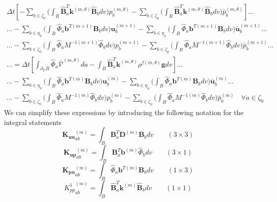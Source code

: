 \documentclass[11pt]{article} %
\begin{document}
\begin{eqnarray}
	\Delta t \left[ - \sum_{b \in \zeta_0} \bigg( \int_B \hat{\mathbf{B}}_a^T \mathbf{k}^{(m,\theta)} \hat{\mathbf{B}}_b dv \bigg) p_b^{(m,\theta)} - \sum_{b \in \zeta_p} \bigg(  \int_B \hat{\mathbf{B}}_a^T \mathbf{k}^{(m,\theta)} \hat{\mathbf{B}}_b dv \bigg) \bar{p}_b^{(m,\theta)} \right] ... \nonumber \\
	... - \sum_{b \in \eta_0} \bigg( \int_B \hat{\Phi}_a \mathbf{b}^{T (m+1)} \mathbf{B}_b dv \bigg) \mathbf{u}_b^{(m+1)} - \sum_{b \in \eta_u} \bigg( \int_B \hat{\Phi}_a \mathbf{b}^{T (m+1)} \mathbf{B}_b dv \bigg) \bar{\mathbf{u}}_b^{(m+1)} ... \nonumber \\
	... - \sum_{b \in \zeta_0} \bigg( \int_B \hat{\Phi}_a M^{-1 (m+1)} \hat{\Phi}_b dv \bigg) p_b^{(m+1)} - \sum_{b \in \zeta_p} \bigg(  \int_B \hat{\Phi}_a M^{-1 (m+1)} \hat{\Phi}_b dv \bigg) \bar{p}_b^{(m+1)} ... \nonumber \\
	... = \Delta t \left[ \int_{\partial_{\mathcal{V}} B} \hat{\Phi}_a \bar{\mathcal{V}}^{(m,\theta)} da - \int_B \hat{\mathbf{B}}_a^T \mathbf{k}^{(m,\theta)} \rho^{f (m,\theta)} \mathbf{g} dv \right] ... \nonumber \\
	... - \sum_{b \in \eta_0} \bigg( \int_B \hat{\Phi}_a \mathbf{b}^{T (m)} \mathbf{B}_b dv \bigg) \mathbf{u}_b^{(m)} - \sum_{b \in \eta_u} \bigg( \int_B \hat{\Phi}_a \mathbf{b}^{T (m)} \mathbf{B}_b dv \bigg) \bar{\mathbf{u}}_b^{(m)} ... \nonumber \\
	... - \sum_{b \in \zeta_0} \bigg( \int_B \hat{\Phi}_a M^{-1 (m)} \hat{\Phi}_b dv \bigg) p_b^{(m)} - \sum_{b \in \zeta_p} \bigg(  \int_B \hat{\Phi}_a M^{-1 (m)} \hat{\Phi}_b dv \bigg) \bar{p}_b^{(m)} \quad \forall a \in \zeta_0
\end{eqnarray}
We can simplify these expressions by introducing the following notation for the integral statements
\begin{equation}
	\mathbf{K_{uu}}_{ab}^{(m)} = \int_B \mathbf{B}_a^T \mathbf{D}^{(m)} \mathbf{B}_b dv \qquad ( 3 \times 3 )
\end{equation}
\begin{equation}
	\mathbf{K_{up}}_{ab}^{(m)} = \int_B \mathbf{B}_a^T \mathbf{b}^{(m)} \hat{\Phi}_b dv \qquad ( 3 \times 1 )
\end{equation}
\begin{equation}
	\mathbf{K_{pu}}_{ab}^{(m)} = \int_B \hat{\Phi}_a \mathbf{b}^{T (m)} \mathbf{B}_b dv \qquad ( 1 \times 3 )
\end{equation}
\begin{equation}
	{K^1_{pp}}_{ab}^{(m)} = \int_B \hat{\mathbf{B}}_a^T \mathbf{k}^{(m)} \hat{\mathbf{B}}_b dv \qquad ( 1 \times 1 )
\end{equation}
\end{document}
